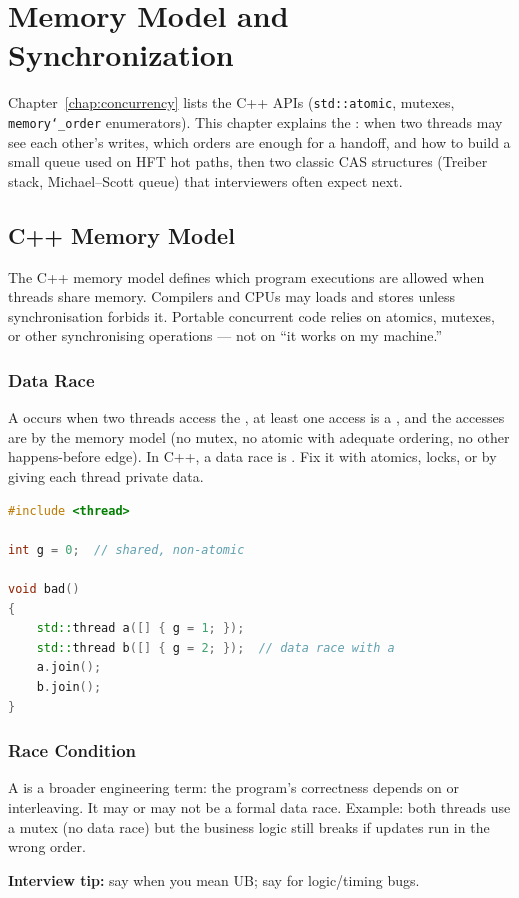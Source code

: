 \chapter{Memory Model and Synchronization}
\label{chap:memorymodel}

Chapter~\ref{chap:concurrency} lists the C++ APIs (\texttt{std::atomic}, mutexes, 
\texttt{memory\char`_order} enumerators). This chapter explains the : when two 
threads may see each other's writes, which orders are enough for a handoff, and how to 
build a small  queue used on HFT hot paths, then two 
classic CAS structures (Treiber stack, Michael--Scott queue) that interviewers 
often expect next.

\section{C++ Memory Model}
\label{sec:cpp-memory-model}
The C++ memory model defines which program executions are allowed when threads share memory. 
Compilers and CPUs may  loads and stores unless synchronisation forbids it. 
Portable concurrent code relies on atomics, mutexes, or other synchronising operations --- 
not on ``it works on my machine.''

\subsection{Data Race}
\label{subsec:data-race}
A  occurs when two threads access the , 
at least one access is a , and the accesses are  by 
the memory model (no mutex, no atomic with adequate ordering, no other happens-before edge).
\newline
In C++, a data race is . Fix it with atomics, locks, or by 
giving each thread private data.

\begin{lstlisting}[language=C++]
#include <thread>

int g = 0;  // shared, non-atomic

void bad()
{
    std::thread a([] { g = 1; });
    std::thread b([] { g = 2; });  // data race with a
    a.join();
    b.join();
}
\end{lstlisting}

\subsection{Race Condition}
\label{subsec:race-condition}
A  is a broader engineering term: the program's correctness depends on 
 or interleaving. It may or may not be a formal data race.
\newline
Example: both threads use a mutex (no data race) but the business logic still breaks if 
updates run in the wrong order.
\par\noindent\textbf{Interview tip:} say  when you mean UB; 
say  for logic/timing bugs.

